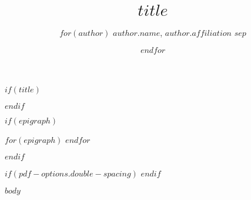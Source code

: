 \documentclass[%
  $if(pdf-options.papersize)$
    $pdf-options.papersize$paper,
  $endif$,
  article,
  $pdf-options.typesize$,
  oneside
  ]{memoir}
\date{}
\title{$title$}
\author{$for(author)$ $author.name$, \emph{$author.affiliation$}
$sep$ \and $endfor$}
\begin{document}
$if(title)$
\maketitle
$endif$

$if(epigraph)$
\begin{epigraphs}
$for(epigraph)$
$endfor$
\end{epigraphs}
$endif$

$if(pdf-options.double-spacing)$
\DoubleSpacing
$endif$

$body$
\end{document}
